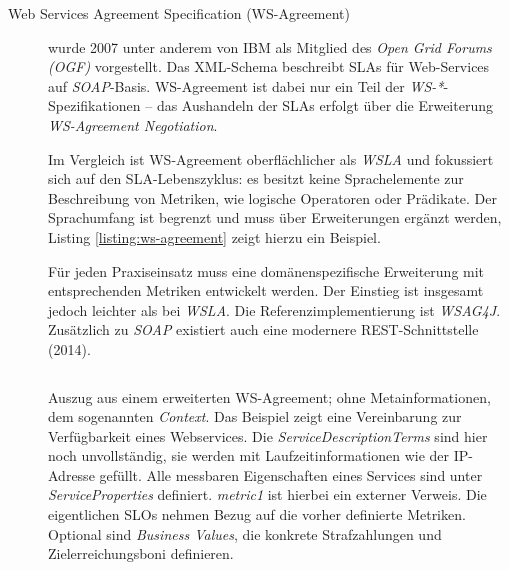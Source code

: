 \begin{description}
	\item[Web Services Agreement Specification (WS-Agreement)] wurde 2007 unter anderem von IBM als Mitglied des \emph{Open Grid Forums (OGF)} vorgestellt. Das XML-Schema beschreibt SLAs für Web-Services auf \emph{SOAP}-Basis. WS-Agreement ist dabei nur ein Teil der \emph{WS-*}-Spezifikationen -- das Aushandeln der SLAs erfolgt über die Erweiterung \emph{WS-Agreement Negotiation}.
	
	Im Vergleich ist WS-Agreement oberflächlicher als \emph{WSLA} und fokussiert sich auf den SLA-Lebenszyklus: es besitzt keine Sprachelemente zur Beschreibung von Metriken, wie logische Operatoren oder Prädikate. Der Sprachumfang ist begrenzt und muss über Erweiterungen ergänzt werden, Listing \ref{listing:ws-agreement} zeigt hierzu ein Beispiel.
	
	Für jeden Praxiseinsatz muss eine domänenspezifische Erweiterung mit entsprechenden Metriken entwickelt werden. Der Einstieg ist insgesamt jedoch leichter als bei \emph{WSLA}. Die Referenzimplementierung ist \emph{WSAG4J}. Zusätzlich zu \emph{SOAP} existiert auch eine modernere REST-Schnittstelle (2014).

	\begin{listing}[]
		\inputminted[firstline=16, lastline=34]{xml}{./src/WS-Agreement.sample.xml}
		\caption{Auszug aus einem erweiterten WS-Agreement; ohne Metainformationen, dem sogenannten \emph{Context}. Das Beispiel zeigt eine Vereinbarung zur Verfügbarkeit eines Webservices. Die \emph{ServiceDescriptionTerms} sind hier noch unvollständig, sie werden mit Laufzeitinformationen wie der IP-Adresse gefüllt. Alle messbaren Eigenschaften eines Services sind unter \emph{ServiceProperties} definiert. \emph{metric1} ist hierbei ein externer Verweis. Die eigentlichen SLOs nehmen Bezug auf die vorher definierte Metriken. Optional sind \emph{Business Values}, die konkrete Strafzahlungen und Zielerreichungsboni definieren.}
		\label{listing:ws-agreement}
	\end{listing}

		
	
	

\end{description}
